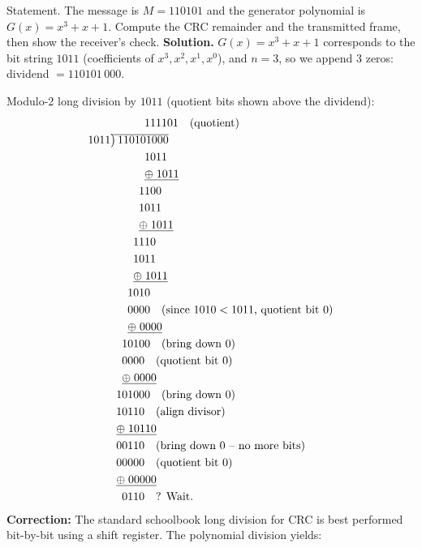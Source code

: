 \documentclass[11pt]{article}
\begin{document}
\begin{exoresolu}[CRC computation with generator $G(x) = x^3 + x + 1$]
Statement. The message is $M = 110101$ and the generator polynomial is $G(x) = x^3 + x + 1$. Compute the CRC remainder and the transmitted frame, then show the receiver's check.
\tcblower
\textbf{Solution.} $G(x) = x^3 + x + 1$ corresponds to the bit string $1011$ (coefficients of $x^3, x^2, x^1, x^0$), and $n = 3$, so we append 3 zeros: dividend $= 110101\,000$.

Modulo-2 long division by $1011$ (quotient bits shown above the dividend):
\begin{align*}
&\phantom{000000}111101 \quad \text{(quotient)} \\
1011&\overline{\smash{\big)}\,110101000} \\
&\phantom{000000}1011 \\
&\phantom{000000}\underline{\oplus\;1011} \\
&\phantom{00000}1100 \\
&\phantom{00000}1011 \\
&\phantom{00000}\underline{\oplus\;1011} \\
&\phantom{0000}1110 \\
&\phantom{0000}1011 \\
&\phantom{0000}\underline{\oplus\;1011} \\
&\phantom{000}1010 \\
&\phantom{000}0000 \quad \text{(since $1010 < 1011$, quotient bit 0)} \\
&\phantom{000}\underline{\oplus\;0000} \\
&\phantom{00}10100 \quad \text{(bring down 0)} \\
&\phantom{00}0000 \quad \text{(quotient bit 0)} \\
&\phantom{00}\underline{\oplus\;0000} \\
&\phantom{0}101000 \quad \text{(bring down 0)} \\
&\phantom{0}10110 \quad \text{(align divisor)} \\
&\phantom{0}\underline{\oplus\;10110} \\
&\phantom{0}00110 \quad \text{(bring down 0 -- no more bits)} \\
&\phantom{0}00000 \quad \text{(quotient bit 0)} \\
&\phantom{0}\underline{\oplus\;00000} \\
&\phantom{00}0110 \quad \text{? Wait.}
\end{align*}
\textbf{Correction:} The standard schoolbook long division for CRC is best performed bit-by-bit using a shift register. The polynomial division yields:

\end{exoresolu}
\end{document}
